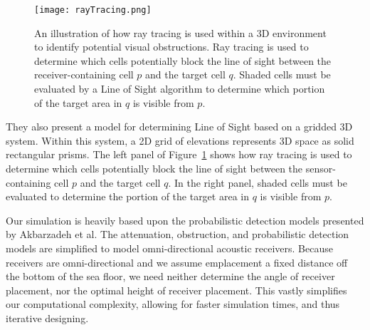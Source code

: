 \begin{figure}[ht]
	\centering
	\texttt{[image: rayTracing.png]}
	\caption{An illustration of how ray tracing is used within a 3D environment to identify potential visual obstructions.  Ray tracing is used to determine which cells potentially block the line of sight between the receiver-containing cell $p$ and the target cell $q$.  Shaded cells must be evaluated by a Line of Sight algorithm to determine which portion of the target area in $q$ is visible from $p$. \cite{Akbarzadeh2013}\label{rayTracingImg1}}
\end{figure}

They also present a model for determining Line of Sight based on a gridded 3D system.  Within this system, a 2D grid of elevations represents 3D space as solid rectangular prisms.  The left panel of Figure~\ref{rayTracingImg1} shows how ray tracing is used to determine which cells potentially block the line of sight between the sensor-containing cell $p$ and the target cell $q$.  In the right panel, shaded cells must be evaluated to determine the portion of the target area in $q$ is visible from $p$.


Our simulation is heavily based upon the probabilistic detection models presented by Akbarzadeh et al.  The attenuation, obstruction, and probabilistic detection models are simplified to model omni-directional acoustic receivers.  Because receivers are omni-directional and we assume emplacement a fixed distance off the bottom of the sea floor, we need neither determine the angle of receiver placement, nor the optimal height of receiver placement.  This vastly simplifies our computational complexity, allowing for faster simulation times, and thus iterative designing.


